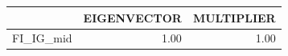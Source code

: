 \begin{tabular}{rrr}
  \hline
 & EIGENVECTOR & MULTIPLIER \\ 
  \hline
FI\_IG\_mid & 1.00 & 1.00 \\ 
   \hline
\end{tabular}
